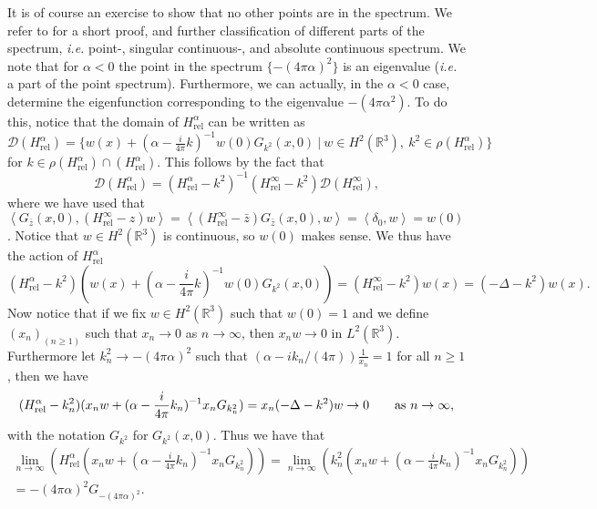 \documentclass[a4paper,11pt]{article}
\newcommand{\dom}[1]{\mathscr D\left(#1\right)}
\renewcommand{\braket}[1]{\left\langle#1\right\rangle}
\newcommand{\ie}{\emph{i.e.} }
\newcommand{\R}{\mathbb{R}}
\numberwithin{equation}{section}
\begin{document}
It is of course an exercise to show that no other points are in the spectrum. We refer to \cite{albeverio2012solvable} for a short proof, and further classification of different parts of the spectrum, \ie point-, singular continuous-, and absolute continuous spectrum. 
We note that for $ \alpha<0 $ the point in the spectrum $ \{-(4\pi\alpha)^2\} $ is an eigenvalue (\ie a part of the point spectrum). Furthermore, we can actually, in the $ \alpha<0 $ case, determine the eigenfunction corresponding to the eigenvalue $ -(4\pi\alpha^2) $. To do this, notice that the domain of $ H_{\text{rel}}^\alpha $ can be written as\\ $ \dom{H_{\text{rel}}^\alpha}=\{w(x)+(\alpha-\frac{i}{4\pi}k)^{-1}w(0)G_{k^2}(x,0)\ |\ w\in H^2(\R^3),\ k^2\in\rho(H_{\text{rel}}^\alpha)\} $ for $ k\in\rho(H_{\text{rel}}^\alpha)\cap(H_{\text{rel}}^\alpha) $. This follows by the fact that \begin{equation}
\dom{H_{\text{rel}}^\alpha}=(H_{\text{rel}}^\alpha-k^2)^{-1}(H_{\text{rel}}^\infty-k^2)\dom{H_{\text{rel}}^\infty},
\end{equation}
where we have used that $ \braket{G_{\bar{z}}(x,0),(H_{\text{rel}}^\infty-z)w}=\braket{(H_{\text{rel}}^\infty-\bar{z})G_{\bar{z}}(x,0),w}=\braket{\delta_0,w}=w(0) $. Notice that $ w\in H^2(\R^3) $ is continuous, so $ w(0) $ makes sense. We thus have the action of $ H_{\text{rel}}^\alpha $\begin{equation}
(H_{\text{rel}}^\alpha-k^2)(w(x)+(\alpha-\frac{i}{4\pi}k)^{-1}w(0)G_{k^2}(x,0))=(H_{\text{rel}}^\infty-k^2)w(x)=(-\Delta-k^2)w(x).
\end{equation}
Now notice that if we fix $ w\in H^2(\R^3) $ such that $ w(0)=1 $ and we define $ (x_n)_{(n\geq1)} $ such that $ x_n\to0 $ as $ n\to\infty $, then $ x_nw\to0 $ in $ L^2(\R^3) $. Furthermore let $ k_n^2\to-(4\pi\alpha)^2 $ such that $ \left(\alpha-ik_n/(4\pi)\right)\frac{1}{x_n}=1 $ for all $ n\geq1 $, then we have \begin{equation}
(H_{\text{rel}}^\alpha-k_n^2)(x_nw+(\alpha-\frac{i}{4\pi}k_n)^{-1}x_nG_{k_n^2})=x_n(-\Delta-k^2)w\to 0\qquad \text{as $ n\to\infty $},
\end{equation}
with the notation $ G_{k^2} $ for $ G_{k^2}(x,0) $. Thus we have that \begin{equation}
\begin{aligned}
\lim_{n\to\infty}\left(H_{\text{rel}}^\alpha(x_nw+(\alpha-\frac{i}{4\pi}k_n)^{-1}x_nG_{k_n^2})\right)=\lim\limits_{n\to\infty}\left(k_n^2(x_nw+(\alpha-\frac{i}{4\pi}k_n)^{-1}x_nG_{k_n^2})\right)\\= -(4\pi\alpha)^2G_{-(4\pi\alpha)^2}.
\end{aligned}
\end{equation}
\end{document}
